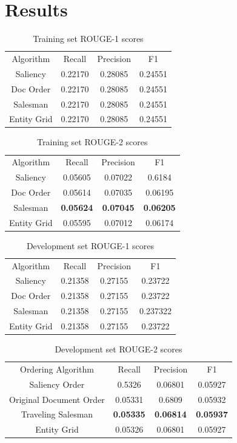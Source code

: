 \documentclass[11pt]{article}
\begin{document}
\section{Results}

\begin{table}[ht]
\caption{Training set ROUGE-1 scores}
\centering
\begin{tabular}{c c c c}
\hline
Algorithm & Recall & Precision & F1\\
Saliency & 0.22170 & 0.28085 & 0.24551\\
Doc Order & 0.22170 & 0.28085 & 0.24551\\
Salesman & 0.22170 & 0.28085 & 0.24551\\
	Entity Grid & 0.22170 & 0.28085 & 0.24551\\
\end{tabular}
\end{table}

\begin{table}[ht]
\caption{Training set ROUGE-2 scores}
\centering
\begin{tabular}{c c c c}
\hline
Algorithm & Recall & Precision & F1\\
Saliency & 0.05605 & 0.07022 & 0.6184\\
Doc Order & 0.05614 & 0.07035 & 0.06195\\
	Salesman & \textbf{0.05624} & \textbf{0.07045} & \textbf{0.06205}\\
	Entity Grid & 0.05595 & 0.07012 & 0.06174\\
\end{tabular}
\end{table}

\begin{table}[ht]
\caption{Development set ROUGE-1 scores}
\centering
\begin{tabular}{c c c c}
\hline
Algorithm & Recall & Precision & F1\\
	Saliency & 0.21358 & 0.27155 & 0.23722\\
	Doc Order & 0.21358 & 0.27155 & 0.23722\\
	Salesman & 0.21358 & 0.27155 & 0.237322\\
	Entity Grid & 0.21358 & 0.27155 & 0.23722\\
\end{tabular}
\end{table}

\begin{table}[ht]
\caption{Development set ROUGE-2 scores}
\centering
\begin{tabular}{c c c c}
\hline
Ordering Algorithm & Recall & Precision & F1\\
	Saliency Order & 0.5326& 0.06801 & 0.05927\\
	Original Document Order & 0.05331 & 0.6809 & 0.05932\\
	Traveling Salesman & \textbf{0.05335} & \textbf{0.06814} & \textbf{0.05937}\\
	Entity Grid & 0.05326 & 0.06801 & 0.05927\\
\end{tabular}
\end{table}
\end{document}
